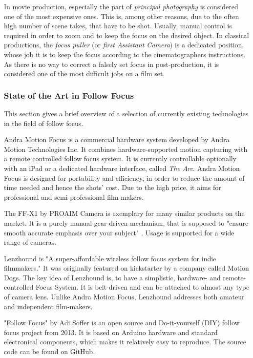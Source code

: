 \documentclass{sigchi}
\begin{document}
In movie production, especially the part of \textit{principal photography} is considered one of the most expensive ones. This is, among other reasons, due to the often high number of scene takes, that have to be shot. \cite{kcrabb}
Usually, manual control is required in order to zoom and to keep the focus on the desired object. In classical productions, the \textit{focus puller} (or \textit{first Assistant Camera}) is a dedicated position, whose job it is to keep the focus according to the cinematographers instructions. As there is no way to correct a falsely set focus in post-production, it is considered one of the most difficult jobs on a film set. \cite{cineman}

\subsubsection{State of the Art in Follow Focus}

This section gives a brief overview of a selection of currently existing technologies in the field of follow focus. 

Andra Motion Focus is a commercial hardware system developed by Andra Motion Technologies Inc. It combines hardware-supported motion capturing with a remote controlled follow focus system. It is currently controllable optionally with an iPad or a dedicated hardware interface, called \textit{The Arc}. Andra Motion Focus is designed for portability and efficiency, in order to reduce the amount of time needed and hence the shots' cost. Due to the high price, it aims for professional and semi-professional film-makers. \cite{andra}

The FF-X1 by PROAIM Camera is exemplary for many similar products on the market. It is a purely manual gear-driven mechanism, that is supposed to "ensure smooth accurate emphasis over your subject" \cite{proaim}. Usage is supported for a wide range of cameras. 

Lenzhound is "A super-affordable wireless follow focus system for indie filmmakers." \cite{kicklenz} It was originally featured on kickstarter by a company called Motion Dogs. The key idea of Lenzhound is, to have a simplistic, hardware- and remote-controlled Focus System. It is belt-driven and can be attached to almost any type of camera lens. Unlike Andra Motion Focus, Lenzhound addresses both amateur and independent film-makers. 

"Follow Focus" by Adi Soffer is an open source and Do-it-yourself (DIY) follow focus project from 2013. It is based on Arduino hardware and standard electronical components, which makes it relatively easy to reproduce. The source code can be found on GitHub. \cite{soffer}
\end{document}
